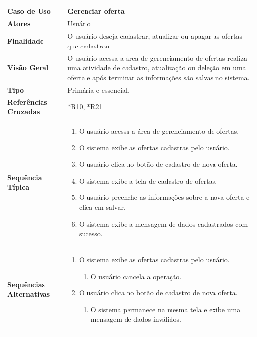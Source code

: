 \documentclass[a4paper,11pt]{article}
\begin{document}
\begin{table}[H]
		\begin{tabularx}{\textwidth}{|l|X|}
		\hline
			\textbf{Caso de Uso} &  Gerenciar oferta \\ \hline
			\textbf{Atores} &  Usuário  \\ \hline
			\textbf{Finalidade} &  O usuário deseja cadastrar, atualizar ou apagar as ofertas que cadastrou. \\ \hline
			\textbf{Visão Geral} & O usuário acessa a área de gerenciamento de ofertas realiza uma atividade de cadastro, atualização ou deleção em uma oferta e após terminar as informações são salvas no sistema. \\ \hline
			\textbf{Tipo} & Primária e essencial. \\ \hline
			\textbf{Referências Cruzadas} & *R10, *R21 \\ \hline
			\textbf{Sequência Típica} & 
			\begin{enumerate}
			\item O usuário acessa a área de gerenciamento de ofertas.
			\item O sistema exibe as ofertas cadastras pelo usuário.
			\item O usuário clica no botão de cadastro de nova oferta.
			\item O sistema exibe a tela de cadastro de ofertas.
			\item O usuário preenche as informações sobre a nova oferta e clica em salvar.
			\item O sistema exibe a mensagem de dados cadastrados com sucesso.
			\end{enumerate} \\ \hline
			\textbf{Sequências Alternativas} & 
			\begin{enumerate}
			\item O sistema exibe as ofertas cadastras pelo usuário.
			\begin{enumerate}
			\item O usuário cancela a operação.
			\end{enumerate}
			\item O usuário clica no botão de cadastro de nova oferta.			
			\begin{enumerate}
			\item O sistema permanece na mesma tela e exibe uma mensagem de dados inválidos.
			\end{enumerate}
			\end{enumerate} \\ \hline
		\end{tabularx}
\end{table}
\end{document}
